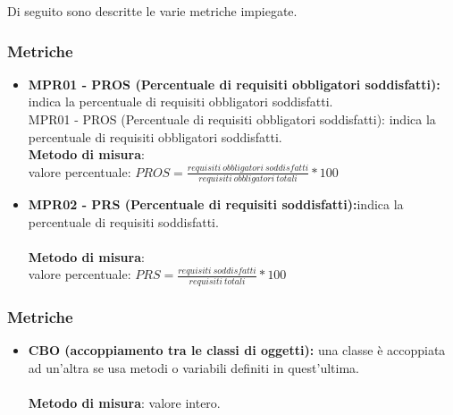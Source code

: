 Di seguito sono descritte le varie metriche impiegate.

\subsubsection{Metriche}
\begin{itemize}
    \item \textbf{MPR01 - PROS (Percentuale di requisiti obbligatori soddisfatti):} indica la percentuale di requisiti obbligatori soddisfatti.\\
    MPR01 - PROS (Percentuale di requisiti obbligatori soddisfatti): indica la percentuale di requisiti obbligatori soddisfatti.
    \\\textbf{Metodo di misura}:\\valore percentuale: $PROS = \frac{requisiti \ obbligatori \ soddisfatti}{requisiti \ obbligatori \ totali} * 100$
    \item \textbf{MPR02 - PRS (Percentuale di requisiti soddisfatti):}indica la percentuale di requisiti soddisfatti.\\
    \\\textbf{Metodo di misura}:\\valore percentuale: $PRS = \frac{requisiti \ soddisfatti}{requisiti \ totali} * 100$
\end{itemize}

\subsubsection{Metriche}
\begin{itemize}
    \item \textbf{CBO (accoppiamento tra le classi di oggetti):} una classe è accoppiata ad un'altra se usa metodi o variabili definiti in quest'ultima.\\
    \\\textbf{Metodo di misura}: valore intero.
\end{itemize}

